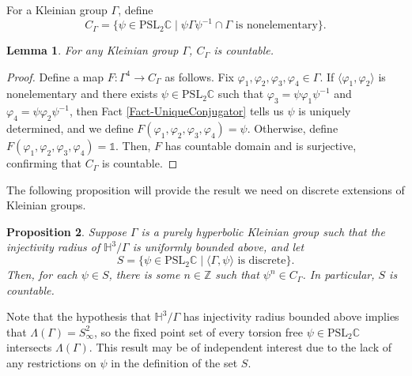 \documentclass[11pt,leqno]{article}
\newtheorem{lemma}{Lemma}
\newtheorem{prop}[lemma]{Proposition}
\theoremstyle{introdef}
\numberwithin{lemma}{section}
\theoremstyle{definition}
\newcommand{\Z}{\mathbb{Z}}
\newcommand{\C}{\mathbb{C}}
\begin{document}
For a Kleinian group $\Gamma$, define \[C_\Gamma=\{\psi\in\mathrm{PSL}_2\C\;|\;\psi\Gamma\psi^{-1}\cap\Gamma\text{ is nonelementary}\}.\]

\begin{lemma}
    \label{Lemma-CCountable}
    For any Kleinian group $\Gamma$, $C_\Gamma$ is countable.
\end{lemma}

\begin{proof}
    Define a map $F:\Gamma^4\rightarrow C_\Gamma$ as follows. Fix $\varphi_1,\varphi_2,\varphi_3,\varphi_4\in\Gamma$. If $\langle\varphi_1,\varphi_2\rangle$ is nonelementary and there exists $\psi\in\mathrm{PSL}_2\C$ such that $\varphi_3=\psi\varphi_1\psi^{-1}$ and $\varphi_4=\psi\varphi_2\psi^{-1}$, then Fact \ref{Fact-UniqueConjugator} tells us $\psi$ is uniquely determined, and we define $F(\varphi_1,\varphi_2,\varphi_3,\varphi_4)=\psi$. Otherwise, define $F(\varphi_1,\varphi_2,\varphi_3,\varphi_4)=\mathds{1}$. Then, $F$ has countable domain and is surjective, confirming that $C_\Gamma$ is countable.
\end{proof}

The following proposition will provide the result we need on discrete extensions of Kleinian groups.

\begin{prop}
\label{Thm-DiscCountable}
    Suppose $\Gamma$ is a purely hyperbolic Kleinian group such that the injectivity radius of $\mathbb{H}^3/\Gamma$ is uniformly bounded above, and let \[S=\{\psi\in\mathrm{PSL}_2\C \;|\; \langle\Gamma,\psi\rangle\text{ is discrete}\}.\] Then, for each $\psi\in S$, there is some $n\in\Z$ such that $\psi^n\in C_\Gamma$. In particular, $S$ is countable. 
\end{prop}

Note that the hypothesis that $\mathbb{H}^3/\Gamma$ has injectivity radius bounded above implies that $\Lambda(\Gamma)= S^2_\infty$, so the fixed point set of every torsion free $\psi\in\mathrm{PSL}_2\C$ intersects $\Lambda(\Gamma)$. This result may be of independent interest due to the lack of any restrictions on $\psi$ in the definition of the set $S$. 
\end{document}

